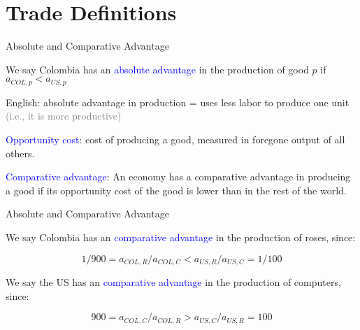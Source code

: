 \documentclass[notes,11pt, aspectratio=169, xcolor=table]{beamer}
\newcommand{\blue}[1]{\textcolor{blue}{#1}}
\newenvironment{wideitemize}{\itemize\addtolength{\itemsep}{10pt}}{\enditemize}
\begin{document}
\section{Trade Definitions}

\begin{frame}{Absolute and Comparative Advantage}

\begin{wideitemize}
    \item We say Colombia has an \textcolor{blue}{absolute advantage} in the production of good $p$ if $a_{COL,p} < a_{US,p}$

    \item English: absolute advantage in production = uses less labor to produce one unit \\
    \qquad \textcolor{gray}{(i.e., it is more productive)}

    \item \textcolor{blue}{Opportunity cost}: cost of producing a good, measured in foregone output of all others.

    \item \blue{Comparative advantage}: An economy has a comparative advantage in producing a good if its opportunity cost of the good is lower than in the rest of the world.

\end{wideitemize}

\end{frame}


\begin{frame}{Absolute and Comparative Advantage}

\begin{wideitemize}

    \item We say Colombia has an \textcolor{blue}{comparative advantage} in the production of roses, since:
    
    \begin{equation*}
        1/900 = a_{COL,R}/a_{COL,C} < a_{US,R}/a_{US,C} = 1/100
    \end{equation*}

    \item We say the US has an \textcolor{blue}{comparative advantage} in the production of computers, since:
    
    \begin{equation*}
        900 = a_{COL,C}/a_{COL,R
        } > a_{US,C}/a_{US,R} = 100
    \end{equation*}

\end{wideitemize}

\end{frame}
\end{document}
